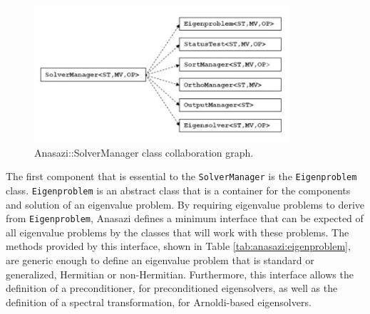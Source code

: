 \documentclass[acmtoms]{acmtrans2m}
\newcommand{\aspace}[1]{\texttt{#1}}
\begin{document}
\begin{figure}[htb]
\label{fig:solverColl}
\begin{center}
\includegraphics[height=2in]{anasazi_slvr_collaborations.pdf}
\end{center}
\caption{Anasazi::SolverManager class collaboration graph.}
\end{figure}

The first component that is essential to the \aspace{SolverManager} is the
\aspace{Eigenproblem} class.  \aspace {Eigenproblem} is an abstract class that is a
container for the components and solution of an eigenvalue problem. By requiring
eigenvalue problems to derive from \aspace{Eigenproblem}, Anasazi defines a minimum
interface that can be expected of all eigenvalue problems by the classes that will work
with these problems. The methods provided by this interface, shown in Table
\ref{tab:anasazi:eigenproblem}, are generic enough to define an eigenvalue problem that is
standard or generalized, Hermitian or non-Hermitian. Furthermore, this interface allows
the definition of a preconditioner, for preconditioned eigensolvers, as well as the
definition of a spectral transformation, for Arnoldi-based eigensolvers. 
\end{document}
